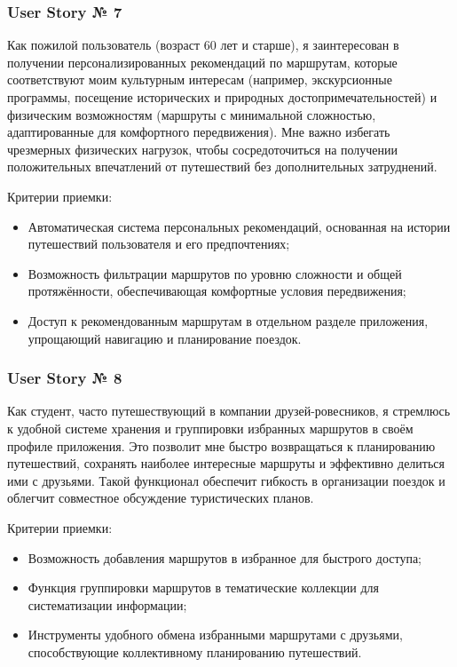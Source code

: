 \subsubsection*{User Story № 7} 
Как пожилой пользователь (возраст 60 лет и старше), я заинтересован в получении персонализированных рекомендаций по маршрутам, которые соответствуют моим культурным интересам (например, экскурсионные программы, посещение исторических и природных достопримечательностей) и физическим возможностям (маршруты с минимальной сложностью, адаптированные для комфортного передвижения). Мне важно избегать чрезмерных физических нагрузок, чтобы сосредоточиться на получении положительных впечатлений от путешествий без дополнительных затруднений.

Критерии приемки:
\begin{itemize}
    \item Автоматическая система персональных рекомендаций, основанная на истории путешествий пользователя и его предпочтениях;
    \item Возможность фильтрации маршрутов по уровню сложности и общей протяжённости, обеспечивающая комфортные условия передвижения;
    \item Доступ к рекомендованным маршрутам в отдельном разделе приложения, упрощающий навигацию и планирование поездок.
\end{itemize}


\subsubsection*{User Story № 8} 
Как студент, часто путешествующий в компании друзей-ровесников, я стремлюсь к удобной системе хранения и группировки избранных маршрутов в своём профиле приложения. Это позволит мне быстро возвращаться к планированию путешествий, сохранять наиболее интересные маршруты и эффективно делиться ими с друзьями. Такой функционал обеспечит гибкость в организации поездок и облегчит совместное обсуждение туристических планов.

Критерии приемки:
\begin{itemize}
    \item Возможность добавления маршрутов в избранное для быстрого доступа;
    \item Функция группировки маршрутов в тематические коллекции для систематизации информации;
    \item Инструменты удобного обмена избранными маршрутами с друзьями, способствующие коллективному планированию путешествий.
\end{itemize}


